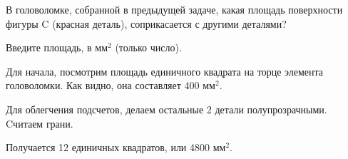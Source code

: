 
В головоломке, собранной в предыдущей задаче, какая площадь поверхности фигуры C (красная деталь), соприкасается с другими деталями?


Введите площадь,  в мм$^2$  (только число).

\solutionSection

Для начала, посмотрим площадь единичного квадрата на торце элемента головоломки. Как видно, она составляет 400 мм$^2$.

Для облегчения подсчетов, делаем остальные 2 детали полупрозрачными.  Cчитаем грани.

Получается 12 единичных квадратов, или 4800 мм$^2$.



